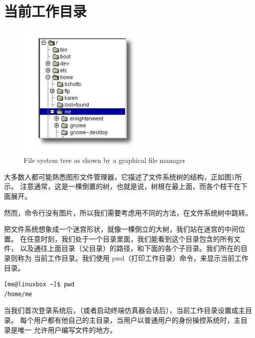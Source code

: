 \section{当前工作目录}

\begin{figure}[h!]
\centering
\includegraphics[width=2.5in]{images/1.png}
\caption{File system tree as shown by a graphical file manager}
\label{fig_sim}
\end{figure}

大多数人都可能熟悉图形文件管理器，它描述了文件系统树的结构，正如图1所示。 注意通常，这是一棵倒置的树，也就是说，树根在最上面，而各个枝干在下面展开。

\par 然而，命令行没有图片，所以我们需要考虑用不同的方法，在文件系统树中跳转。

\par 把文件系统想象成一个迷宫形状，就像一棵倒立的大树，我们站在迷宫的中间位置。 在任意时刻，我们处于一个目录里面，我们能看到这个目录包含的所有文件， 以及通往上面目录（父目录）的路径，和下面的各个子目录。我们所在的目录则称为 当前工作目录。我们使用 pwd（打印工作目录）命令，来显示当前工作目录。

\begin{lstlisting}
[me@linuxbox ~]$ pwd
/home/me
\end{lstlisting}

\par 当我们首次登录系统后，（或者启动终端仿真器会话后），当前工作目录设置成主目录。 每个用户都有他自己的主目录，当用户以普通用户的身份操控系统时，主目录是唯一 允许用户编写文件的地方。

